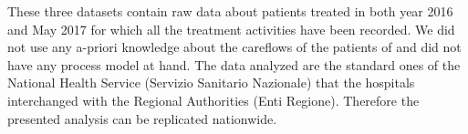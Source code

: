 These three datasets contain raw data about patients treated in both year 2016 and May 2017 for which all the treatment activities have been recorded. We did not use any a-priori knowledge about the careflows of the patients of \hospital and did not have any process model at hand. The data analyzed are the standard ones of the National Health Service (Servizio Sanitario Nazionale) that the hospitals interchanged with the Regional Authorities (Enti Regione). Therefore the presented analysis can be replicated nationwide.%
\clearpage


